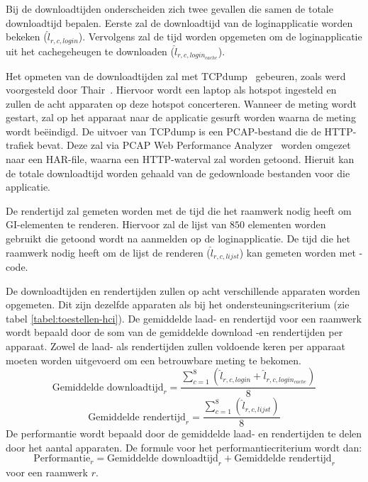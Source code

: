Bij de downloadtijden onderscheiden zich twee gevallen die samen de totale downloadtijd bepalen.
Eerste zal de downloadtijd van de loginapplicatie worden bekeken ($\widehat{l}_{r,c,login}$). 
Vervolgens zal de tijd worden opgemeten om de loginapplicatie uit het cachegeheugen te downloaden ($\widehat{l}_{r,c,login_{cache}}$).

Het opmeten van de downloadtijden zal met TCPdump~\cite{Tcpdump2010} gebeuren, zoals werd voorgesteld door Thair~\cite{Thair2011}.
Hiervoor wordt een laptop als hotspot ingesteld en zullen de acht apparaten op deze hotspot concerteren.
Wanneer de meting wordt gestart, zal op het apparaat naar de applicatie gesurft worden waarna de meting wordt beëindigd. 
De uitvoer van TCPdump is een PCAP-bestand die de HTTP-trafiek bevat.
Deze zal via PCAP Web Performance Analyzer~\cite{SongL.bmcquadeMdsteele2010} worden omgezet naar een HAR-file, waarna een HTTP-waterval zal worden getoond.
Hieruit kan de totale downloadtijd worden gehaald van de gedownloade bestanden voor die applicatie.

De rendertijd zal gemeten worden met de tijd die het raamwerk nodig heeft om GI-elementen te renderen.
Hiervoor zal de lijst van $850$ elementen worden gebruikt die getoond wordt na aanmelden op de loginapplicatie.
De tijd die het raamwerk nodig heeft om de lijst de renderen ($\widehat{l}_{r,c,lijst}$) kan gemeten worden met \js-code.

De downloadtijden en rendertijden zullen op acht verschillende apparaten worden opgemeten.
Dit zijn dezelfde apparaten als bij het ondersteuningscriterium (zie tabel \ref{tabel:toestellen-hci}).
De gemiddelde laad- en rendertijd voor een raamwerk wordt bepaald door de som van de gemiddelde download -en rendertijden per apparaat.
Zowel de laad- als rendertijden zullen voldoende keren per apparaat moeten worden uitgevoerd om een betrouwbare meting te bekomen.
\begin{equation}
  \text{Gemiddelde downloadtijd}_r= \frac{\sum\limits_{c=1}^{8}{\left(\widehat{l}_{r,c,login}+\widehat{l}_{r,c,login_{cache}}\right)}}{8}
    \label{eq:totale-downloadtijd}
\end{equation}
\begin{equation}
  \text{Gemiddelde rendertijd}_r= \frac{\sum\limits_{c=1}^{8}{\left(\widehat{l}_{r,c,lijst}\right)}}{8}
  \label{eq:totale-gebruikerservaring}
\end{equation}
De performantie wordt bepaald door de gemiddelde laad- en rendertijden te delen door het aantal apparaten.
De formule voor het performantiecriterium wordt dan:
\begin{equation}
  \text{Performantie}_r= \text{Gemiddelde downloadtijd}_r + \text{Gemiddelde rendertijd}_r
  \label{eq:performantie}
\end{equation}
voor een raamwerk $r$.


